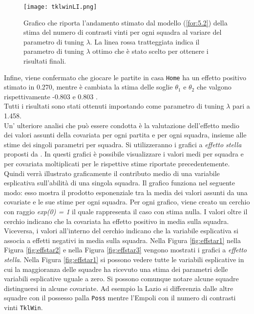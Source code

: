 \begin{figure}[htbp]
	\begin{center}
		\texttt{[image: tklwinLI.png]}
		\caption{Grafico che riporta l'andamento stimato dal modello (\ref{for:5.2}) della stima del numero di contrasti vinti per ogni squadra al variare del parametro di tuning $\lambda$. La linea rossa tratteggiata indica il parametro di tuning $\lambda$ ottimo che è stato scelto per ottenere i risultati finali.} \label{fig:tklwinLI}
	\end{center}
\end{figure}
Infine, viene confermato che giocare le partite in casa \texttt{Home} ha un effetto positivo stimato in 0.270, mentre è cambiata la stima delle soglie $\theta_1$ e $\theta_2$ che valgono rispettivamente -0.803  e 0.803 .\\
Tutti i risultati sono stati ottenuti impostando come parametro di tuning $\lambda$ pari a 1.458.\\

Un' ulteriore analisi che può essere condotta è la valutazione dell'effetto medio dei valori assunti della covariata per ogni partita e per ogni squadra, insieme alle stime dei singoli parametri per squadra. Si utilizzeranno i grafici a \emph{effetto stella} proposti da \textcite{tutz2013visualization}. In questi grafici è possibile visualizzare i valori medi per squadra e per covariata moltiplicati per le rispettive stime riportate precedentemente. Quindi verrà illustrato graficamente il contributo medio di una variabile esplicativa sull'abilità di una singola squadra. Il grafico funziona nel seguente modo: esso mostra il prodotto esponenziale tra la media dei valori assunti da una covariate e le sue stime per ogni squadra. Per ogni grafico, viene creato un cerchio con raggio \emph{exp(0) = 1} il quale rappresenta il caso con stima nulla. I valori oltre il cerchio indicano che la covariata ha effetto positivo in media sulla squadra. Viceversa, i valori all'interno del cerchio indicano che la variabile esplicativa si associa a effetti negativi in media sulla squadra. Nella Figura \ref{fig:effstar1} nella Figura \ref{fig:effstar2} e nella Figura \ref{fig:effstar3} vengono mostrati i grafici a \emph{effetto stella}.
Nella Figura \ref{fig:effstar1} si possono vedere tutte le variabili esplicative in cui la maggioranza delle squadre ha ricevuto una stima dei parametri delle variabili esplicative   uguale a zero. Si possono comunque notare alcune squadre distinguersi in alcune covariate.
Ad esempio la Lazio si differenzia dalle altre squadre con il possesso palla \texttt{Poss} mentre l'Empoli con il numero di contrasti vinti \texttt{TklWin}.\\

